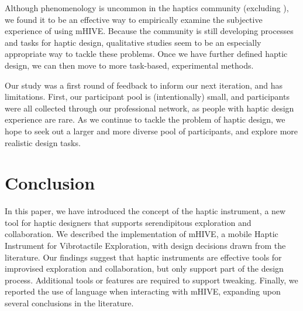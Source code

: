 Although phenomenology is uncommon in the haptics community (excluding \cite{Obrist2013}), we found it to be an effective way to empirically examine the subjective experience of using mHIVE.
Because the community is still developing processes and tasks for haptic design, qualitative studies seem to be an especially appropriate way to tackle these problems.
Once we have further defined haptic design, we can then move to more task-based, experimental methods.

Our study was a first round of feedback to inform our next iteration, and has limitations.
First, our participant pool is (intentionally) small,
and participants were all collected through our professional network, as people with haptic design experience are rare.
As we continue to tackle the problem of haptic design, we hope to seek out a larger and more diverse pool of participants, and %
explore more realistic design tasks. %


%
% 
\section{Conclusion}

In this paper, we have introduced the concept of the haptic instrument, a new tool for haptic designers that supports serendipitous exploration and collaboration.
We described the implementation of mHIVE, a mobile Haptic Instrument for Vibrotactile Exploration, with design decisions drawn from the literature.
Our findings suggest that haptic instruments are effective tools for improvised exploration and collaboration, but only support part of the design process.
Additional tools or features are required to support tweaking.
Finally, we reported the use of language when interacting with mHIVE, %
expanding upon several conclusions in the literature.

